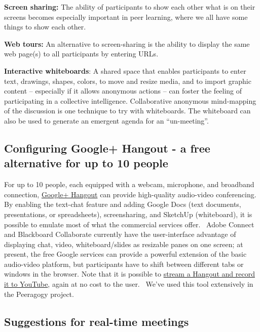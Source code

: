 \textbf{Screen sharing:} The ability of participants to show each other
what is on their screens becomes especially important in peer learning,
where we all have some things to show each other.

\textbf{Web tours:} An alternative to screen-sharing is the ability to
display the same web page(s) to all participants by entering URLs.

\textbf{Interactive whiteboards}: A shared space that enables
participants to enter text, drawings, shapes, colors, to move and resize
media, and to import graphic content -- especially if it allows
anonymous actions -- can foster the feeling of participating in a
collective intelligence. Collaborative anonymous mind-mapping of the
discussion is one technique to try with whiteboards. The whiteboard can
also be used to generate an emergent agenda for an ``un-meeting''.

\subsection{Configuring Google+ Hangout - a free alternative for up to
10
people}\label{configuring-google-hangout---a-free-alternative-for-up-to-10-people}

For up to 10 people, each equipped with a webcam, microphone, and
broadband connection,
\href{http://lifehacker.com/5842191/google\%252B-hangouts-adds-screen-sharing-google-docs-collaboration-and-more}{Google+
Hangout} can provide high-quality audio-video conferencing. By enabling
the text-chat feature and adding Google Docs (text documents,
presentations, or spreadsheets), screensharing, and SketchUp
(whiteboard), it is possible to emulate most of what the commercial
services offer.~ Adobe Connect and Blackboard Collaborate currently have
the user-interface advantage of displaying chat, video,
whiteboard/slides as resizable panes on one screen; at present, the free
Google services can provide a powerful extension of the basic
audio-video platform, but participants have to shift between different
tabs or windows in the browser. Note that it is possible to
\href{http://www.google.com/+/learnmore/hangouts/onair.html}{stream a
Hangout and record it to YouTube}, again at no cost to the user.~ We've
used this tool extensively in the Peeragogy project.

\subsection{Suggestions for real-time
meetings}\label{suggestions-for-real-time-meetings}

